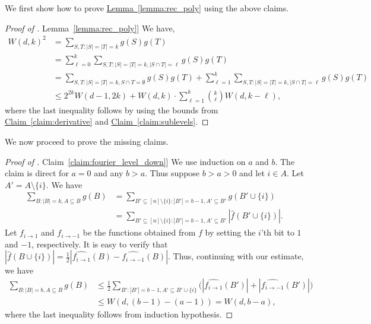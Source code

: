 \documentclass[11pt]{article}
\numberwithin{equation}{section}
\theoremstyle{definition}
\theoremstyle{plain}
\newcommand{\expref}[2]{\hyperref[#2]{#1~\ref{#2}}}
\begin{document}
We first show how to prove \expref{Lemma}{lemma:rec_poly} using the above claims.
\begin{proof}[Proof of \expref{Lemma}{lemma:rec_poly}]
We have,
\begin{align*}
W(d,k)^2 &= \sum_{S,T: |S|=|T|=k} g(S) g(T) \\
 &= \sum_{\ell =0}^{k} \sum_{S, T: |S|= |T|=k, |S \cap T|=\ell} g(S) g(T) \\
 &= \sum_{S,T: |S|= |T|=k, S \cap T = \emptyset} g(S) g(T) + \sum_{\ell =1}^{k} \sum_{S, T: |S|= |T|=k, |S \cap T|=\ell} g(S) g(T) \\
 &\le 2^{2k}W(d-1,2k) + W(d,k) \cdot \sum_{\ell=1}^{k} \binom{k}{\ell}  W(d, k -\ell),
\end{align*} where the last inequality follows by using the bounds from \expref{Claim}{claim:derivative} and \expref{Claim}{claim:sublevels}.
\end{proof}
We now proceed to prove the missing claims.
\begin{proof}[Proof of \expref{Claim}{claim:fourier_level_down}] We use induction on $a$ and $b$. The claim is direct for $a =0$  and any $b > a$. Thus suppose $b>a>0$ and let $ i\in A$. Let $A' = A \setminus \{ i\}$. We have
\begin{align*}
\sum_{B:|B|=k, A \subseteq B} g(B) &=  \sum_{B' \subseteq [n] \setminus \{ i\}:|B'|=b-1, A' \subseteq B' } g(B' \cup \{ i\}) \\
& = \sum_{B' \subseteq [n] \setminus \{ i\}:|B'|=b-1, A' \subseteq B' } |\widehat{f}(B' \cup \{ i\})|.
\end{align*}
Let $f_{i\rightarrow1}$ and $f_{i\rightarrow-1}$ be the functions obtained from $f$ by setting the $i$'th bit to $1$ and $-1$, respectively. It is easy to verify that $|\widehat{f}(B \cup \{ i\})| = \frac{1}{2}|\widehat{f_{i\rightarrow1}}(B) - \widehat{f_{i\rightarrow-1}}(B)|$. Thus, continuing with our estimate, we have
\begin{align*}
\sum_{B:|B|=b, A \subseteq B} g(B)  &\le \frac{1}{2}\sum_{B':|B'|=b-1, A' \subseteq B' \cup \{ i\} } \big(|\widehat{f_{i\rightarrow1}}(B')| + |\widehat{f_{i\rightarrow-1}}(B')|\big) \\
&\le W(d,(b-1)- (a-1))=W(d,b-a),
\end{align*} where the last inequality follows from induction hypothesis.
\end{proof}
\end{document}
